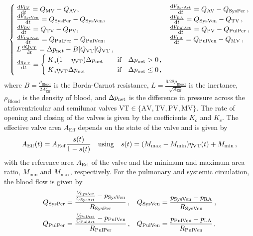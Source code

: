 \begin{equation}
\begin{cases}
\dv{\vol{LV}}{t} = \Q{MV} - \Q{AV} \qc& 
\dv{\vol{SysArt}}{t} = \Q{AV} - \Q{SysPer} \,, \\
\dv{\vol{SysVen}}{t} = \Q{SysPer} - \Q{SysVen} \qc& 
\dv{\vol{RA}}{t} = \Q{SysVen} - \Q{TV} \,, \\
\dv{\vol{RV}}{t} = \Q{TV} - \Q{PV} \qc& 
\dv{\vol{PulArt}}{t} = \Q{PV} - \Q{PulPer} \,, \\
\dv{\vol{PulVen}}{t} = \Q{PulPer} - \Q{PulVen} \qc& 
\dv{\vol{LA}}{t} = \Q{PulVen} - \Q{MV} \,, \\
L \dv{\Q{VT}}{t} = \Delta\p{net} - B \abs{\Q{VT}} \Q{VT}\,,& \\
\dv{\state{VT}}{t} = 
\begin{cases}
K_o (1 - \state{VT}) \Delta\p{net} & \qif \Delta\p{net} > 0\,, \\
K_c \state{VT} \Delta\p{net} & \qif \Delta\p{net} \leq 0\,,
\end{cases}
\end{cases} \label{eq:Circ}
\end{equation}
where $B=\frac{\rho_\mathrm{Blood}}{2 A_\mathrm{Eff}^2}$ is the Borda-Carnot resistance, $L = \frac{6.28 \rho_\mathrm{Blood}}{\sqrt{A_\mathrm{Eff}}}$ is the inertance, $\rho_\mathrm{Blood}$ is the density of blood, and $\Delta p_\mathrm{net}$ is the difference in pressure across the atrioventricular and semilunar valves $\mathrm{VT} \in \{\mathrm{AV,TV,PV,MV}\}$.
The rate of opening and closing of the valves is given by the coefficients $K_o$ and $K_c$.
The effective valve area $A_\mathrm{Eff}$ depends on the state of the valve and is given by
\begin{equation}
    A_\mathrm{Eff}(t) = A_\mathrm{Ref} \frac{s(t)}{1 - s(t)} \qusing s(t) = (M_\mathrm{max} - M_\mathrm{min}) \state{VT}(t) + M_\mathrm{min} \,,
\end{equation}
with the reference area $A_\mathrm{Ref}$ of the valve and the minimum and maximum  area ratio, $M_\mathrm{min}$ and $M_\mathrm{max}$, respectively.
For the pulmonary and systemic circulation, the blood flow is given by
\begin{align}
    Q_{\text{SysPer}} 
        &= \frac{\frac{V_\mathrm{\text{SysArt}}}{C_\text{SysArt}} - p_\text{SysVen}}{R_\text{SysPer}} \,,&
    Q_{\text{SysVen}} 
        &=\frac{p_\text{SysVen} - p_\text{RA}}{R_\text{SysVen}} \,,\\
    Q_{\text{PulPer}} 
        &= \frac{\frac{V_\mathrm{\text{PulArt}}}{C_\text{PulArt}}  - p_\text{PulVen}}{R_\text{PulPer}} \,,&
    Q_{\text{PulVen}} 
        &= \frac{p_\text{PulVen} - p_\text{LA}}{R_\text{PulVen}} \,,
\end{align}

